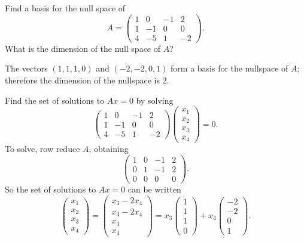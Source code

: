 \documentclass{ximera}
\begin{document}
\begin{exercise} \label{c5.5.3}
Find a basis for the null space of
\[
A =\left(\begin{array}{rrrr} 1 & 0 & -1 & 2\\ 1 & -1 & 0 & 0\\
4 & -5 & 1 & -2 \end{array} \right).
\]
What is the dimension of the null space of $A$?

\begin{solution}

\ans The vectors $(1,1,1,0)$ and $(-2,-2,0,1)$ form a basis for the
nullspace of $A$; therefore the dimension of the nullspace is $2$.

\soln Find the set of solutions to $Ax = 0$ by solving
\[
\left(\begin{array}{rrrr} 1 & 0 & -1 & 2 \\ 1 & -1 & 0 & 0 \\ 4
& -5 & 1 & -2 \end{array}\right) \left(\begin{array}{r} x_1 \\ x_2
\\ x_3 \\ x_4 \end{array}\right) = 0.
\]
To solve, row reduce $A$, obtaining
\[
\left(\begin{array}{rrrr} 1 & 0 & -1 & 2 \\ 0 & 1 & -1 & 2 \\ 0
& 0 & 0 & 0 \end{array}\right).
\]
So the set of solutions to $Ax = 0$ can be written
\[
\left(\begin{array}{r} x_1 \\ x_2 \\ x_3 \\ x_4
\end{array}\right) = \left(\begin{array}{c} x_3 - 2x_4 \\ x_3 - 2x_4
\\ x_3 \\ x_4 \end{array}\right) = x_3\left(\begin{array}{r} 1 \\ 1
\\ 1 \\ 0 \end{array}\right) + x_4\left(\begin{array}{r} -2 \\ -2
\\ 0 \\ 1 \end{array}\right).
\]

\end{solution}
\end{exercise}
\end{document}
